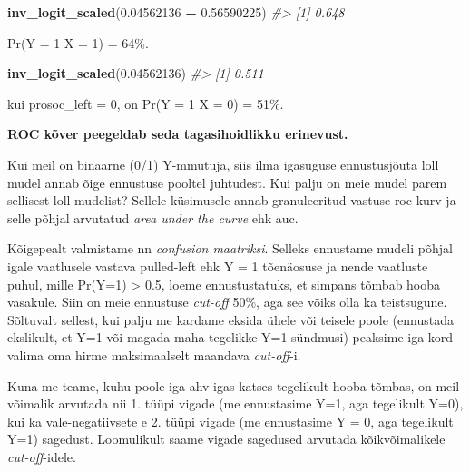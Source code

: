 \documentclass[]{book}
\newenvironment{Shaded}{\begin{snugshade}}{\end{snugshade}}
\newcommand{\KeywordTok}[1]{\textcolor[rgb]{0.13,0.29,0.53}{\textbf{#1}}}
\newcommand{\FloatTok}[1]{\textcolor[rgb]{0.00,0.00,0.81}{#1}}
\newcommand{\StringTok}[1]{\textcolor[rgb]{0.31,0.60,0.02}{#1}}
\newcommand{\CommentTok}[1]{\textcolor[rgb]{0.56,0.35,0.01}{\textit{#1}}}
\newcommand{\OperatorTok}[1]{\textcolor[rgb]{0.81,0.36,0.00}{\textbf{#1}}}
\newcommand{\NormalTok}[1]{#1}
\begin{document}
\begin{Shaded}
\begin{Highlighting}[]
\KeywordTok{inv_logit_scaled}\NormalTok{(}\FloatTok{0.04562136} \OperatorTok{+}\StringTok{ }\FloatTok{0.56590225}\NormalTok{)}
\CommentTok{#> [1] 0.648}
\end{Highlighting}
\end{Shaded}

Pr(Y = 1 \textbar{} X = 1) = 64\%.

\begin{Shaded}
\begin{Highlighting}[]
\KeywordTok{inv_logit_scaled}\NormalTok{(}\FloatTok{0.04562136}\NormalTok{)}
\CommentTok{#> [1] 0.511}
\end{Highlighting}
\end{Shaded}

kui prosoc\_left = 0, on Pr(Y = 1 \textbar{} X = 0) = 51\%.

\textbf{ROC kõver peegeldab seda tagasihoidlikku erinevust.}

Kui meil on binaarne (0/1) Y-mmutuja, siis ilma igasuguse ennustusjõuta
loll mudel annab õige ennustuse pooltel juhtudest. Kui palju on meie
mudel parem sellisest loll-mudelist? Sellele küsimusele annab
granuleeritud vastuse roc kurv ja selle põhjal arvutatud \emph{area
under the curve} ehk auc.

Kõigepealt valmistame nn \emph{confusion maatriksi}. Selleks ennustame
mudeli põhjal igale vaatlusele vastava pulled-left ehk Y = 1 tõenäosuse
ja nende vaatluste puhul, mille Pr(Y=1) \textgreater{} 0.5, loeme
ennustustatuks, et simpans tõmbab hooba vasakule. Siin on meie ennustuse
\emph{cut-off} 50\%, aga see võiks olla ka teistsugune. Sõltuvalt
sellest, kui palju me kardame eksida ühele või teisele poole (ennustada
ekslikult, et Y=1 või magada maha tegelikke Y=1 sündmusi) peaksime iga
kord valima oma hirme maksimaalselt maandava \emph{cut-off}-i.

Kuna me teame, kuhu poole iga ahv igas katses tegelikult hooba tõmbas,
on meil võimalik arvutada nii 1. tüüpi vigade (me ennustasime Y=1, aga
tegelikult Y=0), kui ka vale-negatiivsete e 2. tüüpi vigade (me
ennustasime Y = 0, aga tegelikult Y=1) sagedust. Loomulikult saame
vigade sagedused arvutada kõikvõimalikele \emph{cut-off}-idele.
\end{document}
